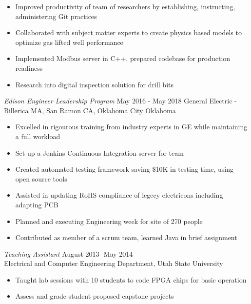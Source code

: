\documentclass[line,margin]{res}
\begin{document}
\begin{resume}
\begin{itemize}
		\item Improved productivity of team of researchers by establishing, instructing, administering Git practices
		\item Collaborated with subject matter experts to create physics based models to optimize gas lifted well performance
		\item Implemented Modbus server in C++, prepared codebase for production readiness
		\item Research into digital inspection solution for drill bits
	\end{itemize}
	{\sl Edison Engineer Leadership Program} \hfill May 2016 - May 2018
	General Electric - Billerica MA, San Ramon CA, Oklahoma City Oklahoma
	\begin{itemize} \itemsep -2pt
		\item Excelled in rigourous training from industry experts in GE while maintaining a full workload
		\item Set up a Jenkins Continuous Integration server for team
		\item Created automated testing framework saving \$10K in testing time, using open source tools
		\item Assisted in updating RoHS compliance of legecy electricons including adapting PCB
		\item Planned and executing Engineering week for site of 270 people
		\item Contributed as member of a scrum team, learned Java in brief assignment
	\end{itemize}
	{\sl Teaching Assistant} \hfill August 2013- May 2014 \\
	Electrical and Computer Engineering Department, Utah State University
	\begin{itemize}  \itemsep -2pt %
		\item Taught lab sessions with 10 students to code FPGA chips for
		      basic operation
		\item Assess and grade student proposed capstone projects
	\end{itemize}


\end{resume}
\end{document}
